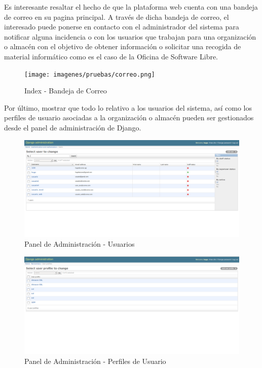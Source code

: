 \documentclass[a4paper,11pt]{book}
\begin{document}
Es interesante resaltar el hecho de que la plataforma web cuenta con una bandeja de correo en su pagina principal. A través de dicha bandeja de correo, el interesado puede ponerse en contacto con el administrador del sistema para notificar alguna incidencia o con los usuarios que trabajan para una organización o  almacén con el objetivo de obtener información o solicitar una recogida de material informático como es el caso de la Oficina de Software Libre.  
 
\begin{figure}[H] 
\centering 
\texttt{[image: imagenes/pruebas/correo.png]}
\caption{ Index - Bandeja de Correo}
\end{figure}

Por último, mostrar que todo lo relativo a los usuarios del sistema, así como los perfiles de usuario asociadas a la organización o almacén pueden ser gestionados desde el panel de administración de Django.  

\begin{figure}[htb] 
\centering 
\includegraphics[scale=0.25]{imagenes/pruebas/admin.png}
\caption{ Panel de Administración - Usuarios}
\end{figure}

\begin{figure}[htb] 
\centering 
\includegraphics[scale=0.25]{imagenes/pruebas/admin2.png}
\caption{ Panel de Administración - Perfiles de Usuario}
\end{figure}
\end{document}
